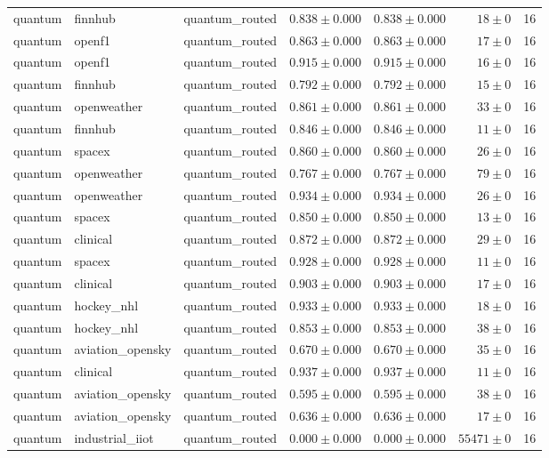 \begin{table}[htbp]
\begin{tabular}{l l l r r r r}
quantum & finnhub & quantum\_routed & $0.838\pm0.000$ & $0.838\pm0.000$ & $18\pm0$ & 16 \\
quantum & openf1 & quantum\_routed & $0.863\pm0.000$ & $0.863\pm0.000$ & $17\pm0$ & 16 \\
quantum & openf1 & quantum\_routed & $0.915\pm0.000$ & $0.915\pm0.000$ & $16\pm0$ & 16 \\
quantum & finnhub & quantum\_routed & $0.792\pm0.000$ & $0.792\pm0.000$ & $15\pm0$ & 16 \\
quantum & openweather & quantum\_routed & $0.861\pm0.000$ & $0.861\pm0.000$ & $33\pm0$ & 16 \\
quantum & finnhub & quantum\_routed & $0.846\pm0.000$ & $0.846\pm0.000$ & $11\pm0$ & 16 \\
quantum & spacex & quantum\_routed & $0.860\pm0.000$ & $0.860\pm0.000$ & $26\pm0$ & 16 \\
quantum & openweather & quantum\_routed & $0.767\pm0.000$ & $0.767\pm0.000$ & $79\pm0$ & 16 \\
quantum & openweather & quantum\_routed & $0.934\pm0.000$ & $0.934\pm0.000$ & $26\pm0$ & 16 \\
quantum & spacex & quantum\_routed & $0.850\pm0.000$ & $0.850\pm0.000$ & $13\pm0$ & 16 \\
quantum & clinical & quantum\_routed & $0.872\pm0.000$ & $0.872\pm0.000$ & $29\pm0$ & 16 \\
quantum & spacex & quantum\_routed & $0.928\pm0.000$ & $0.928\pm0.000$ & $11\pm0$ & 16 \\
quantum & clinical & quantum\_routed & $0.903\pm0.000$ & $0.903\pm0.000$ & $17\pm0$ & 16 \\
quantum & hockey\_nhl & quantum\_routed & $0.933\pm0.000$ & $0.933\pm0.000$ & $18\pm0$ & 16 \\
quantum & hockey\_nhl & quantum\_routed & $0.853\pm0.000$ & $0.853\pm0.000$ & $38\pm0$ & 16 \\
quantum & aviation\_opensky & quantum\_routed & $0.670\pm0.000$ & $0.670\pm0.000$ & $35\pm0$ & 16 \\
quantum & clinical & quantum\_routed & $0.937\pm0.000$ & $0.937\pm0.000$ & $11\pm0$ & 16 \\
quantum & aviation\_opensky & quantum\_routed & $0.595\pm0.000$ & $0.595\pm0.000$ & $38\pm0$ & 16 \\
quantum & aviation\_opensky & quantum\_routed & $0.636\pm0.000$ & $0.636\pm0.000$ & $17\pm0$ & 16 \\
quantum & industrial\_iiot & quantum\_routed & $0.000\pm0.000$ & $0.000\pm0.000$ & $55471\pm0$ & 16 \\

\end{tabular}
\end{table}
